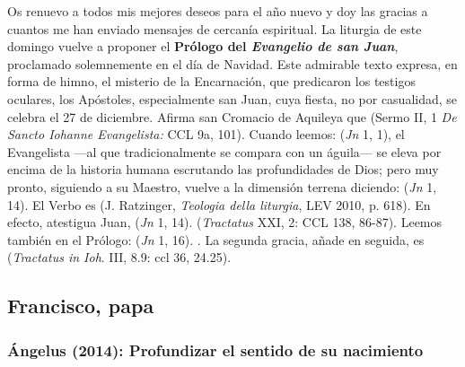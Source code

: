 				\begin{body}
				Os renuevo a todos mis mejores deseos para el año nuevo y doy las gracias a cuantos me han enviado mensajes de cercanía espiritual. La liturgia de este domingo vuelve a proponer el \textbf{Prólogo del \emph{Evangelio de san Juan}}, proclamado solemnemente en el día de Navidad. Este admirable texto expresa, en forma de himno, el misterio de la Encarnación, que predicaron los testigos oculares, los Apóstoles, especialmente san Juan, cuya fiesta, no por casualidad, se celebra el 27 de diciembre. Afirma san Cromacio de Aquileya que  (Sermo II, 1 \emph{De Sancto Iohanne Evangelista:} CCL 9a, 101). Cuando leemos:  (\emph{Jn} 1, 1), el Evangelista ---al que tradicionalmente se compara con un águila--- se eleva por encima de la historia humana escrutando las profundidades de Dios; pero muy pronto, siguiendo a su Maestro, vuelve a la dimensión terrena diciendo:  (\emph{Jn} 1, 14). El Verbo es  (J. Ratzinger, \emph{Teologia della liturgia}, LEV 2010, p. 618). En efecto, atestigua Juan,  (\emph{Jn} 1, 14).  (\emph{Tractatus} XXI, 2: CCL 138, 86-87). Leemos también en el Prólogo:  (\emph{Jn} 1, 16). . La segunda gracia, añade en seguida, es  (\emph{Tractatus in Ioh}. III, 8.9: ccl 36, 24.25).
			\end{body}

\newsection

		\subsection{Francisco, papa}
		
			\subsubsection{Ángelus (2014): Profundizar el sentido de su nacimiento}
			
